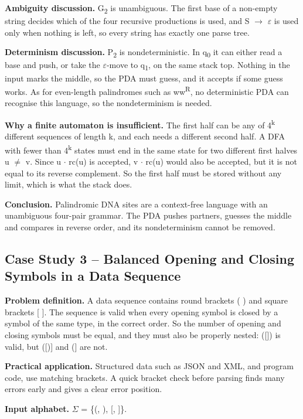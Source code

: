 \documentclass[12pt,a4paper]{article}
\begin{document}
\textbf{Ambiguity discussion.} G\textsubscript{2} is unambiguous. The first base of a non-empty string decides which of the four recursive productions is used, and S \ensuremath{\rightarrow} \ensuremath{\varepsilon} is used only when nothing is left, so every string has exactly one parse tree.

\textbf{Determinism discussion.} P\textsubscript{2} is nondeterministic. In q\textsubscript{0} it can either read a base and push, or take the \ensuremath{\varepsilon}-move to q\textsubscript{1}, on the same stack top. Nothing in the input marks the middle, so the PDA must guess, and it accepts if some guess works. As for even-length palindromes such as ww\textsuperscript{R}, no deterministic PDA can recognise this language, so the nondeterminism is needed.

\textbf{Why a finite automaton is insufficient.} The first half can be any of 4\textsuperscript{k} different sequences of length k, and each needs a different second half. A DFA with fewer than 4\textsuperscript{k} states must end in the same state for two different first halves u \ensuremath{\neq} v. Since u \ensuremath{\cdot} rc(u) is accepted, v \ensuremath{\cdot} rc(u) would also be accepted, but it is not equal to its reverse complement. So the first half must be stored without any limit, which is what the stack does.

\textbf{Conclusion.} Palindromic DNA sites are a context-free language with an unambiguous four-pair grammar. The PDA pushes partners, guesses the middle and compares in reverse order, and its nondeterminism cannot be removed.

\subsection{Case Study 3 -- Balanced Opening and Closing Symbols in a Data Sequence}

\textbf{Problem definition.} A data sequence contains round brackets ( ) and square brackets [ ]. The sequence is valid when every opening symbol is closed by a symbol of the same type, in the correct order. So the number of opening and closing symbols must be equal, and they must also be properly nested: ([]) is valid, but ([)] and (] are not.

\textbf{Practical application.} Structured data such as JSON and XML, and program code, use matching brackets. A quick bracket check before parsing finds many errors early and gives a clear error position.

\textbf{Input alphabet.} \ensuremath{\Sigma} = \{(, ), [, ]\}.
\end{document}
